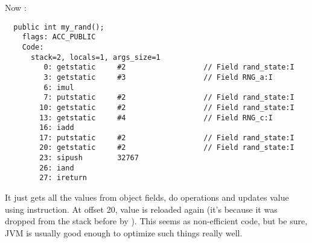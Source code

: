 Now :

\begin{lstlisting}
  public int my_rand();
    flags: ACC_PUBLIC
    Code:
      stack=2, locals=1, args_size=1
         0: getstatic     #2                  // Field rand_state:I
         3: getstatic     #3                  // Field RNG_a:I
         6: imul          
         7: putstatic     #2                  // Field rand_state:I
        10: getstatic     #2                  // Field rand_state:I
        13: getstatic     #4                  // Field RNG_c:I
        16: iadd          
        17: putstatic     #2                  // Field rand_state:I
        20: getstatic     #2                  // Field rand_state:I
        23: sipush        32767
        26: iand          
        27: ireturn       
\end{lstlisting}

It just gets all the values from object fields, do operations and updates 
 value using  instruction.
At offset 20,  value is reloaded again 
(it's because it was dropped from the stack before by ).
This seems as non-efficient code, but be sure, \ac{JVM} is usually good enough to optimize
such things really well.
